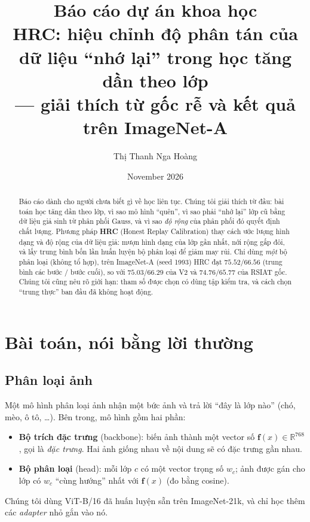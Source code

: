 \documentclass[11pt]{article}
\title{Báo cáo dự án khoa học\\[4pt]
\large HRC: hiệu chỉnh độ phân tán của dữ liệu ``nhớ lại'' trong học tăng dần theo lớp\\
--- giải thích từ gốc rễ và kết quả trên ImageNet-A}
\author{Thị Thanh Nga Hoàng}
\date{November 2026}
\newcommand{\R}{\mathbb{R}}
\newcommand{\vf}{\mathbf{f}}
\begin{document}
\maketitle

\begin{abstract}
Báo cáo dành cho người chưa biết gì về học liên tục. Chúng tôi giải thích từ đầu: bài toán học tăng dần theo lớp, vì sao
mô hình ``quên'', vì sao phải ``nhớ lại'' lớp cũ bằng dữ liệu giả sinh từ phân phối Gauss, và vì sao \emph{độ rộng} của
phân phối đó quyết định chất lượng. Phương pháp \textbf{HRC} (Honest Replay Calibration) thay cách ước lượng hình dạng
và độ rộng của dữ liệu giả: mượn hình dạng của lớp gần nhất, nới rộng gấp đôi, và lấy trung bình bốn lần huấn luyện bộ
phân loại để giảm may rủi. Chỉ dùng \emph{một} bộ phân loại (không tổ hợp), trên ImageNet-A (seed 1993) HRC đạt
$75.52/66.56$ (trung bình các bước / bước cuối), so với $75.03/66.29$ của V2 và $74.76/65.77$ của RSIAT gốc. Chúng tôi
cũng nêu rõ giới hạn: tham số được chọn có dùng tập kiểm tra, và cách chọn ``trung thực'' ban đầu đã không hoạt động.
\end{abstract}

\tableofcontents
\newpage

\section{Bài toán, nói bằng lời thường}

\subsection{Phân loại ảnh}
Một mô hình phân loại ảnh nhận một bức ảnh và trả lời ``đây là lớp nào'' (chó, mèo, ô tô, \dots). Bên trong, mô hình
gồm hai phần:
\begin{itemize}
\item \textbf{Bộ trích đặc trưng} (backbone): biến ảnh thành một vector số $\vf(x)\in\R^{768}$, gọi là \emph{đặc
      trưng}. Hai ảnh giống nhau về nội dung sẽ có đặc trưng gần nhau.
\item \textbf{Bộ phân loại} (head): mỗi lớp $c$ có một vector trọng số $w_c$; ảnh được gán cho lớp có $w_c$ ``cùng
      hướng'' nhất với $\vf(x)$ (đo bằng cosine).
\end{itemize}
Chúng tôi dùng ViT-B/16 đã huấn luyện sẵn trên ImageNet-21k, và chỉ học thêm các \emph{adapter} nhỏ gắn vào nó.
\end{document}
